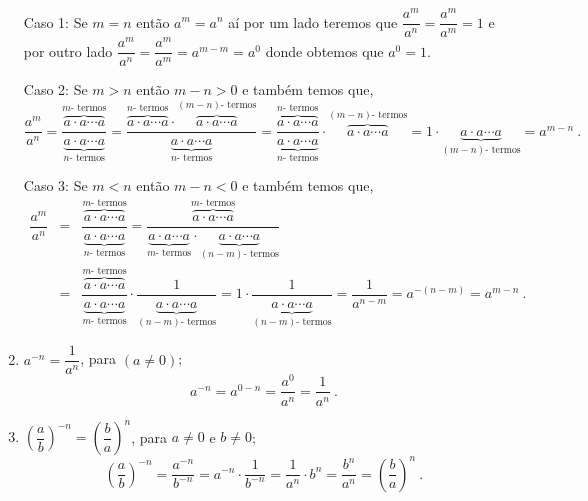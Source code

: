 \begin{enumerate}[P1)]
 Caso 1: Se $m=n$ então $a^m= a^n$ aí por um lado teremos que $\dfrac{a^m}{a^n}= \dfrac{a^m}{a^m}= 1$ e por outro lado $\dfrac{a^m}{a^n}= \dfrac{a^m}{a^m}= a^{m-m}= a^{0}$ donde obtemos que $a^{0}= 1$.

 Caso 2: Se $m > n$ então $m - n> 0$ e também temos que,
 \[\dfrac{a^m}{a^n}= \dfrac{\overbrace{a \cdot a \cdots a}^{m \text{- termos}}}{\underbrace{a \cdot a \cdots a}_{n \text{- termos}}}=
 \dfrac{\overbrace{a \cdot a \cdots a}^{n \text{- termos}} \cdot \overbrace{a \cdot a \cdots a}^{(m-n) \text{- termos}}}{\underbrace{a \cdot a \cdots a}_{n \text{- termos}}}=
 \frac{\overbrace{a \cdot a \cdots a}^{n \text{- termos}}}{\underbrace{a \cdot a \cdots a}_{n \text{- termos}}} \cdot \overbrace{a \cdot a \cdots a}^{(m-n) \text{- termos}} =
 1 \cdot \underbrace{a \cdot a \cdots a}_{(m-n) \text{- termos}}= a^{m-n} \ .\]

 Caso 3: Se $m < n$ então $m - n< 0$ e também temos que,
 \begin{eqnarray*}
  \dfrac{a^m}{a^n} &=&
 \dfrac{\overbrace{a \cdot a \cdots a}^{m \text{- termos}}}{\underbrace{a \cdot a \cdots a}_{n \text{- termos}}}=
 \dfrac{\overbrace{a \cdot a \cdots a}^{m \text{- termos}}}{\underbrace{a \cdot a \cdots a}_{m \text{- termos}} \cdot \underbrace{a \cdot a \cdots a}_{(n-m) \text{- termos}}} \\
 & = &\dfrac{\overbrace{a \cdot a \cdots a}^{m \text{- termos}}}{\underbrace{a \cdot a \cdots a}_{m \text{- termos}}} \cdot \dfrac{1}{\underbrace{a \cdot a \cdots a}_{(n-m) \text{- termos}}}=
 1 \cdot \dfrac{1}{\underbrace{a \cdot a \cdots a}_{(n-m) \text{- termos}}}= \dfrac{1}{a^{n-m}}= a^{-(n-m)}= a^{m-n} \ .
 \end{eqnarray*}


 \item $a^{-n}= \dfrac{1}{a^n}$, para $(a \neq 0)$;
\begin{equation}
a^{-n}= a^{0-n}= \dfrac{a^0}{a^n}= \dfrac{1}{a^n} \ .
\end{equation}

 \item $\left(\dfrac{a}{b} \right)^{-n}= \left(\dfrac{b}{a} \right)^{n}$, para $a \neq 0$ e $b \neq 0$;
\begin{equation}
\left(\dfrac{a}{b} \right)^{-n}= \dfrac{a^{-n}}{b^{-n}}= a^{-n} \cdot \dfrac{1}{b^{-n}}= \dfrac{1}{a^n} \cdot b^{n}= \dfrac{b^n}{a^n}= \left(\dfrac{b}{a}\right)^n \ .
\end{equation}

 \end{enumerate}

